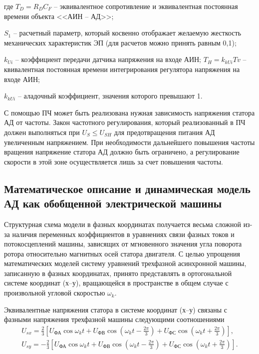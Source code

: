         где $T_D=R_D C_F$ -- эквивалентное сопротивление и эквивалентная
        постоянная времени объекта <<АИН -- АД>>;\par
        $S_1$ -- расчетный параметр,
        который косвенно отображает желаемую жесткость механических
        характеристик ЭП (для расчетов можно принять равным 0,1);\par
        $k_{Ui}$ -- коэффициент передачи датчика напряжения на входе АИН; 
        $T_H = k_{kUi}Tv$ --квивалентная постоянная времени интегрирования
            регулятора напряжения на входе АИН;\par
        $k_{kUi}$ -- аладочный коэффициент, значения которого превышают 1. 

        С помощью ПЧ может быть реализована нужная зависимость напряжения
        статора АД от частоты. Закон частотного регулирования, который
        реализованный в ПЧ должен выполняться при $U_S \leq U_{SH}$ для
        предотвращения питания АД увеличенным напряжением. При необходимости
        дальнейшего повышения частоты вращения напряжение статора АД должно
        быть ограничено, а регулирование скорости в этой зоне осуществляется
        лишь за счет повышения частоты.

    \subsection{Математическое описание и динамическая модель АД как обобщенной
        электрической машины}

        Структурная схема модели в фазных координатах получается весьма сложной
        из-за наличия переменных коэффициентов в уравнениях связи фазных токов
        и потокосцеплений машины, зависящих от мгновенного значения угла
        поворота ротора относительно магнитных осей статора двигателя. С целью
        упрощения математических моделей систему уравнений трехфазной
        асинхронной машины, записанную в фазных координатах, принято
        представлять в ортогональной системе координат (х–у), вращающейся в
        пространстве в общем случае с произвольной угловой скоростью $\omega_k$.

        Эквивалентные напряжения статора в системе координат (х–у) связаны с
        фазными напряжения трехфазной машины следующими соотношениями
        \begin{gather*}
            U_{sx} = \frac{2}{3} \left[ U_\text{ФА}\cos\omega_k t+U_\text{ФВ}
                \cos\left(\omega_k t-\frac{2\pi}{3}\right)+U_\text{ФС} \cos
                    \left( \omega_k t+\frac{2\pi}{3}\right)\right],\\
            U_{sy} = -\frac{2}{3} \left[ U_\text{ФА}\cos\omega_k t+U_\text{ФВ}
                \cos\left(\omega_k t-\frac{2\pi}{3}\right)+U_\text{ФС} \cos
                    \left( \omega_k t+\frac{2\pi}{3}\right)\right].\\
        \end{gather*}

